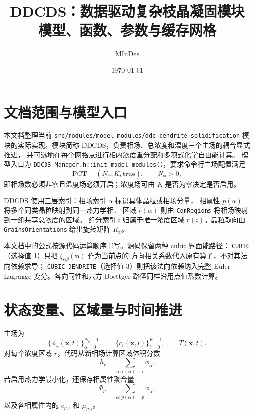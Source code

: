 \documentclass[UTF8,a4paper,11pt]{ctexart}
\title{DDCDS：数据驱动复杂枝晶凝固模块\\模型、函数、参数与缓存网格}
\author{MInDes}
\date{\today}
\newcommand{\vct}[1]{\bm{#1}}
\newcommand{\code}[1]{\texttt{#1}}
\begin{document}
\maketitle
\tableofcontents

\section{文档范围与模型入口}

本文档整理当前
\code{src/modules/model\_modules/ddc\_dendrite\_solidification}
模块的实际实现。模块简称 DDCDS，负责相场、总浓度和温度三个主场的耦合显式推进，
并可选地在每个网格点进行相内浓度重分配和多项式化学自由能计算。
模型入口为 \code{DDCDS\_Manager.h::init\_model\_modules()}，要求命令行主场配置满足
\begin{equation}
  \mathrm{PCT}=(N_\phi,K,\mathrm{true}),\qquad N_\phi>0,
\end{equation}
即相场数必须非零且温度场必须开启；浓度场可由 $K$ 是否为零决定是否启用。

DDCDS 使用三层索引：相场索引 $\alpha$ 标识具体晶粒或相场分量，
相属性 $p(\alpha)$ 将多个同类晶粒映射到同一热力学相，
区域 $r(\alpha)$ 则由 \code{ConRegions} 将相场映射到一组共享总浓度的区域。
组分索引 $i$ 归属于唯一浓度区域 $r(i)$。晶粒取向由
\code{GrainsOrientations} 给出旋转矩阵 $R_\alpha$。

本文档中的公式按源代码运算顺序书写。源码保留两种 cubic 界面能路径：
\code{CUBIC}（选择值 1）只把 $\xi_{\alpha\beta}(\vct n)$ 作为当前点的
方向相关系数代入原有算子，不对其法向依赖求导；
\code{CUBIC\_DENDRITE}（选择值 3）则把该法向依赖纳入完整
Euler--Lagrange 变分。各向同性和六方 Boettger 路径同样沿用点值系数计算。

\section{状态变量、区域量与时间推进}

主场为
\begin{equation}
  \{\phi_\alpha(\vct x,t)\}_{\alpha=0}^{N_\phi-1},\qquad
  \{c_i(\vct x,t)\}_{i=0}^{K-1},\qquad T(\vct x,t).
\end{equation}
对每个浓度区域 $r$，代码从新相场计算区域体积分数
\begin{equation}
  h_r=\sum_{\alpha:r(\alpha)=r}\phi_\alpha .
  \label{eq:region-fraction}
\end{equation}
若启用热力学最小化，还保存相属性聚合量
\begin{equation}
  \Phi_p=\sum_{\alpha:p(\alpha)=p}\phi_\alpha,
\end{equation}
以及各相属性内的 $c_{p,i}$ 和 $\mu_{p,i}$。
\end{document}

